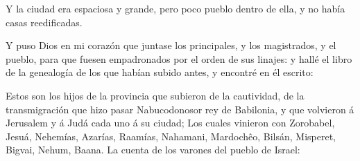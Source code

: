  Y la ciudad era espaciosa y grande, pero poco pueblo dentro
de ella, y no había casas reedificadas.

 Y puso Dios en mi corazón que juntase los principales, y
los magistrados, y el pueblo, para que fuesen empadronados por el orden
de sus linajes: y hallé el libro de la genealogía de los que habían
subido antes, y encontré en él escrito:

 Estos son los hijos de la provincia que subieron de la
cautividad, de la transmigración que hizo pasar Nabucodonosor rey de
Babilonia, y que volvieron á Jerusalem y á Judá cada uno á su ciudad;
 Los cuales vinieron con Zorobabel, Jesuá, Nehemías,
Azarías, Raamías, Nahamani, Mardochêo, Bilsán, Misperet, Bigvai, Nehum,
Baana. La cuenta de los varones del pueblo de Israel:

